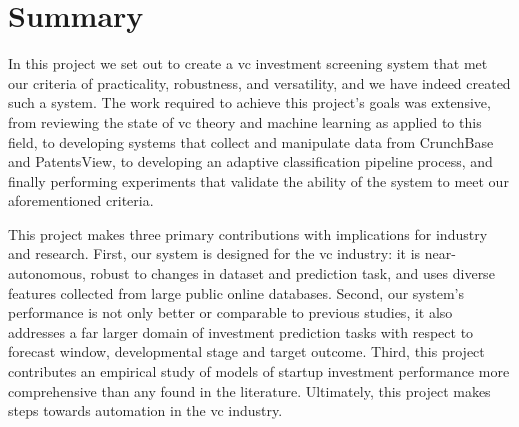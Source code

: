 \documentclass[../thesis/thesis.tex]{subfiles}
\begin{document}
\section{Summary}

In this project we set out to create a \gls{vc} investment screening system that met our criteria of practicality, robustness, and versatility, and we have indeed created such a system. The work required to achieve this project's goals was extensive, from reviewing the state of \gls{vc} theory and machine learning as applied to this field, to developing systems that collect and manipulate data from CrunchBase and PatentsView, to developing an adaptive classification pipeline process, and finally performing experiments that validate the ability of the system to meet our aforementioned criteria.

This project makes three primary contributions with implications for industry and research. First, our system is designed for the \gls{vc} industry: it is near-autonomous, robust to changes in dataset and prediction task, and uses diverse features collected from large public online databases. Second, our system's performance is not only better or comparable to previous studies, it also addresses a far larger domain of investment prediction tasks with respect to forecast window, developmental stage and target outcome. Third, this project contributes an empirical study of models of startup investment performance more comprehensive than any found in the literature. Ultimately, this project makes steps towards automation in the \gls{vc} industry.

\end{document}
